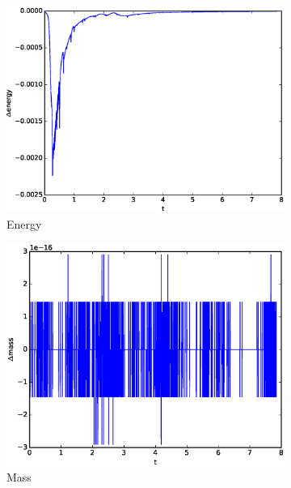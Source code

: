 \begin{figure}[h!]
    \centering
    \begin{subfigure}[b]{0.312\textwidth}
        \centering
        \includegraphics[width=\textwidth]{images/E1d.eps}\hfill
        \caption{Energy}
        \label{fig:Energy}
    \end{subfigure}
    \hfill
    \begin{subfigure}[b]{0.32\textwidth}
        \centering
        \includegraphics[width=\textwidth]{images/Ma1d.eps}\hfill
        \caption{Mass}
        \label{fig:Mass}
    \end{subfigure}
    \hfill
    \begin{subfigure}[b]{0.32\textwidth}

\end{subfigure}
\end{figure}
